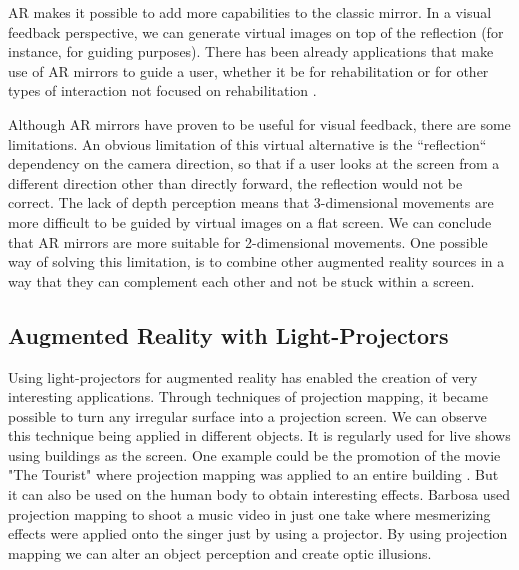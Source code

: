 %

\ac{AR} makes it possible to add more capabilities to the classic mirror. In a visual feedback perspective, we can generate virtual images on top of the reflection (for instance, for guiding purposes). There has been already applications that make use of \ac{AR} mirrors to guide a user, whether it be for rehabilitation \cite{Tang2014a, Velloso2013, Klein2013} or for other types of interaction not focused on rehabilitation \cite{Alhamid2012a, blum2012}.

Although \ac{AR} mirrors have proven to be useful for visual feedback, there are some limitations. 
An obvious limitation of this virtual alternative is the ``reflection`` dependency on the camera direction, 
so that if a user looks at the screen from a different direction
other than directly forward, the reflection would not be correct.
The lack of depth perception means that 3-dimensional movements are more difficult to be guided by virtual images on a flat screen. We can conclude that \ac{AR} mirrors are more suitable for 2-dimensional movements. One possible way of solving this limitation, is to combine other augmented reality sources in a way that they can complement each other and not be stuck within a screen.


\subsection{Augmented Reality with Light-Projectors}
\label{RW-projectionmapping}

Using light-projectors for augmented reality has enabled the creation of very interesting applications. 
Through techniques of projection mapping, it became possible to turn any irregular surface into a projection screen.
We can observe this technique being applied in different objects. It is regularly used for live shows 
using buildings as the screen. One example could be the promotion of the movie "The Tourist" where 
projection mapping was applied to an entire building \cite{projectionmapping_building}. But it can 
also be used on the human body to obtain interesting effects. Barbosa \cite{projectionmapping_face} 
used projection mapping to shoot a music video in just one take where mesmerizing effects were applied 
onto the singer just by using a projector. 
By using projection mapping we can alter an object perception and create optic illusions.

